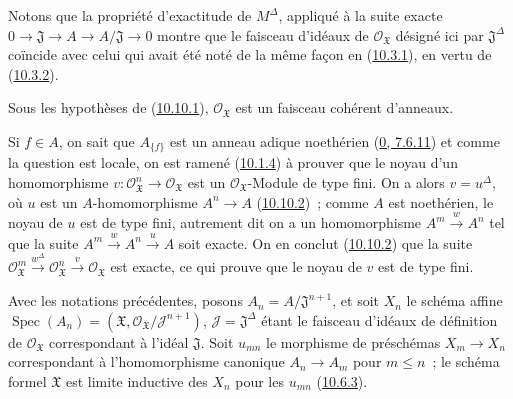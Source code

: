 Notons que la propriété d'exactitude de $M^\Delta$, appliqué à la suite
exacte
$0\to\mathfrak{J}\to A\to A/\mathfrak{J}\to0$ montre que le faisceau
d'idéaux de $\mathscr{O}_{\mathfrak{X}}$ désigné ici par
$\mathfrak{J}^\Delta$ coïncide avec celui qui avait été noté de la même
façon en (\hyperref[I.10.3.1-fr]{10.3.1}), en vertu de
(\hyperref[I.10.3.2-fr]{10.3.2}).

\begin{proposition}[10.10.3]
\label{I.10.10.3-fr}
Sous les hypothèses de (\hyperref[I.10.10.1-fr]{10.10.1}),
$\mathscr{O}_{\mathfrak{X}}$ est un faisceau cohérent d'anneaux.
\end{proposition}

Si $f\in A$, on sait que $A_{\{f\}}$ est un anneau adique noethérien
(\hyperref[0.7.6.11-fr]{0, 7.6.11}) et comme la question est locale, on
est ramené (\hyperref[I.10.1.4-fr]{10.1.4}) à prouver que le noyau d'un
homomorphisme
$v:\mathscr{O}_{\mathfrak{X}}^n\to\mathscr{O}_{\mathfrak{X}}$ est un
$\mathscr{O}_{\mathfrak{X}}$-Module de type fini. On a alors
$v=u^\Delta$, où $u$ est un $A$-homomorphisme $A^n\to A$
(\hyperref[I.10.10.2-fr]{10.10.2})~; comme $A$ est noethérien, le noyau
de $u$ est de type fini, autrement dit on a un homomorphisme
$A^m\xrightarrow{w}A^n$ tel que la suite
$A^m\xrightarrow{w}A^n\xrightarrow{u}A$ soit exacte. On en conclut
(\hyperref[I.10.10.2-fr]{10.10.2}) que la suite
$\mathscr{O}_{\mathfrak{X}}^m\xrightarrow{w^\Delta}
\mathscr{O}_{\mathfrak{X}}^n\xrightarrow{v}
\mathscr{O}_{\mathfrak{X}}$ est exacte, ce qui prouve que le noyau de
$v$ est de type fini.

\begin{env}[10.10.4]
\label{I.10.10.4-fr}
Avec les notations précédentes, posons
$A_n=A/\mathfrak{J}^{n+1}$, et soit $X_n$ le schéma affine
$\operatorname{Spec}(A_n)=(\mathfrak{X},
\mathscr{O}_{\mathfrak{X}}/\mathscr{J}^{n+1})$,
$\mathscr{J}=\mathfrak{J}^\Delta$ étant le faisceau d'idéaux de
définition de $\mathscr{O}_{\mathfrak{X}}$ correspondant à l'idéal
$\mathfrak{J}$. Soit $u_{mn}$ le morphisme de préschémas
$X_m\to X_n$ correspondant à l'homomorphisme canonique
$A_n\to A_m$ pour $m\leq n$~; le schéma formel $\mathfrak{X}$ est
limite inductive des $X_n$ pour les $u_{mn}$
(\hyperref[I.10.6.3-fr]{10.6.3}).
\end{env}

